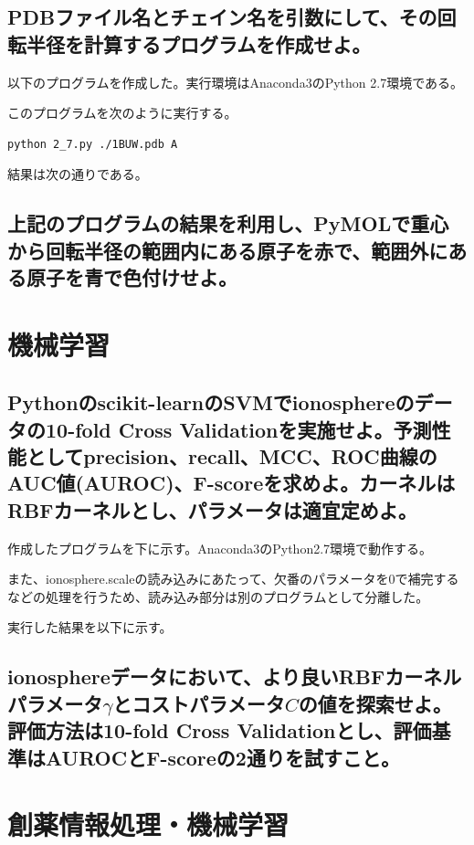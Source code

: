 \documentclass[uplatex,a4j]{jsarticle}
\begin{document}
  \subsection{PDBファイル名とチェイン名を引数にして、その回転半径を計算するプログラムを作成せよ。}
  以下のプログラムを作成した。実行環境はAnaconda3のPython 2.7環境である。
  
  このプログラムを次のように実行する。
  \begin{lstlisting}[caption=実行方法, label=run6]
    python 2_7.py ./1BUW.pdb A
  \end{lstlisting}
  結果は次の通りである。
  
  
  \subsection{上記のプログラムの結果を利用し、PyMOLで重心から回転半径の範囲内にある原子を赤で、範囲外にある原子を青で色付けせよ。}
  
  \section{機械学習}
  \subsection{Pythonのscikit-learnのSVMでionosphereのデータの10-fold Cross Validationを実施せよ。予測性能としてprecision、recall、MCC、ROC曲線のAUC値(AUROC)、F-scoreを求めよ。カーネルはRBFカーネルとし、パラメータは適宜定めよ。}
  作成したプログラムを下に示す。Anaconda3のPython2.7環境で動作する。
  
  また、ionosphere.scaleの読み込みにあたって、欠番のパラメータを0で補完するなどの処理を行うため、読み込み部分は別のプログラムとして分離した。
  
  実行した結果を以下に示す。
  
  
  \subsection{ionosphereデータにおいて、より良いRBFカーネルパラメータ$\gamma$とコストパラメータ$C$の値を探索せよ。評価方法は10-fold Cross Validationとし、評価基準はAUROCとF-scoreの2通りを試すこと。}
  
  \section{創薬情報処理・機械学習}
  
\end{document}
